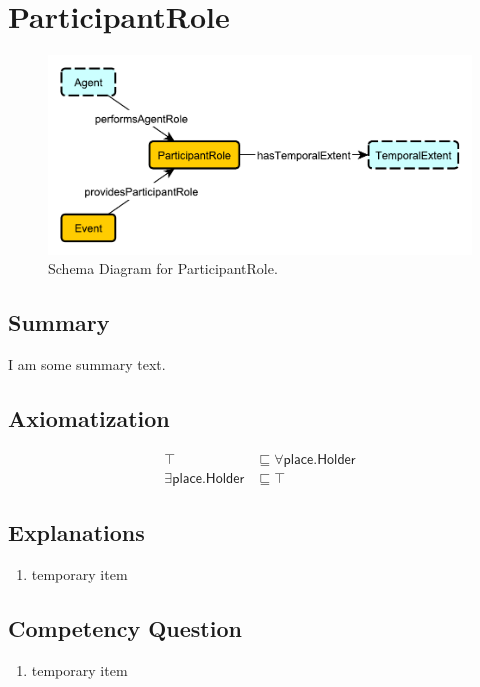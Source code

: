 \section{ParticipantRole}
\label{sec:ParticipantRole}
\begin{figure}[h!]
\begin{center}
\includegraphics[width=.4\textwidth]{figures/participantrole}
\end{center}
\caption{Schema Diagram for ParticipantRole.}
\label{fig:ParticipantRole}
\end{figure}
\subsection{Summary}
\label{sum:ParticipantRole}
I am some summary text.

\subsection{Axiomatization}
\label{axs:ParticipantRole}
\begin{align}
\top &\sqsubseteq \forall\textsf{place.Holder} \\ 
\exists\textsf{place.Holder} &\sqsubseteq \top 
\end{align}

\subsection{Explanations}
\label{exp:ParticipantRole}
\begin{enumerate}
\item temporary item
\end{enumerate}

\subsection{Competency Question}
\label{cqs:ParticipantRole}
\begin{enumerate}[CQ1.]
\item temporary item
\end{enumerate}

\newpage
